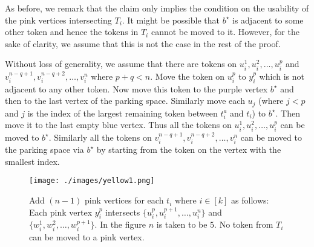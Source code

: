 \begin{claimproof}
As before, we remark that the claim only implies the condition on the
usability of the pink vertices intersecting $T_i$.
It might be possible that $b^{\star}$ is adjacent to some other
token and hence the tokens in $T_i$ cannot be moved to it.
However, for the sake of clarity, we assume that this is not the case
in the rest of the proof.

Without loss of generality, we assume that there are tokens on
$u_i^1,u_i^2,\ldots,u_i^p$ and $v_i^{n-q+1},v_i^{n-q+2},\ldots,v_i^n$
where $p+q<n$.
Move the token on $u_i^p$ to $y_i^p$ which is not adjacent
to any other token.
Now move this token to the purple vertex $b^{\star}$
and then to the last vertex of the parking space.
Similarly move each $u_j$ (where $j<p$ and $j$ is the index
of the largest remaining token between $t_i^a$ and $t_i$) to $b^{\star}$.
Then move it to the last empty blue vertex.
Thus all the tokens on $u_i^1,u_i^2,\ldots,u_i^p$ can be moved
to $b^{\star}$.
Similarly all the tokens on $v_i^{n-q+1},v_i^{n-q+2},\ldots,v_i^n$
can be moved to the parking space via $b^{\star}$ by starting
from the token on the vertex with the smallest index.
\end{claimproof}

\begin{figure}[t]
    \centering
    \texttt{[image: ./images/yellow1.png]}
    \caption{Add $(n-1)$ pink vertices for each $t_i$ where $i\in[k]$ as follows: Each pink vertex $y_i^p$ intersects $\{u_i^p,u_i^{p+1},\ldots,u_i^n\}$ and $\{w_i^1,w_i^2,\ldots,w_i^{p+1}\}$. In the figure $n$ is taken to be $5$.
    No token from $T_i$ can be moved to a pink vertex.}
    \label{Encoding_Vertices_TSC}
    \vspace{-5mm}
\end{figure}

